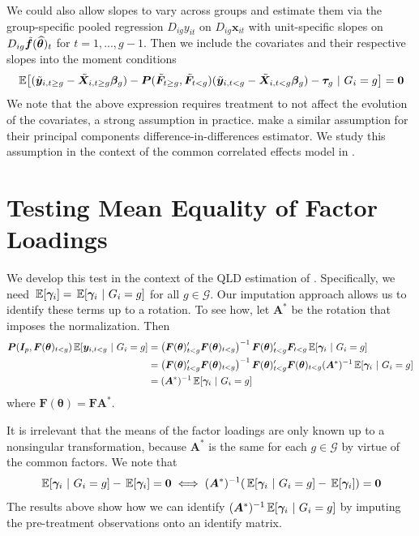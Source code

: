 \documentclass[12pt]{article}
\begin{document}
We could also allow slopes to vary across groups and estimate them via the group-specific pooled regression $D_{ig} y_{it}$ on $D_{ig} \bm x_{it}$ with unit-specific slopes on $D_{ig} \Tilde{\bm f}(\widehat{\bm \theta})_t$ for $t = 1,..., g-1$. Then we include the covariates and their respective slopes into the moment conditions
\begin{equation}
    \E{(\tilde{\bm y}_{i,t\geq g} - \tilde{\bm X}_{i, t \geq g} \bm \beta_g) - \bm P(\tilde{\bm F}_{t \geq g}, \tilde{\bm F}_{t < g}) (\tilde{\bm y}_{i,t< g} - \tilde{\bm X}_{i, t < g} \bm \beta_g) - \bm \tau_g  }{G_i = g} = \bm 0
\end{equation}
We note that the above expression requires treatment to not affect the evolution of the covariates, a strong assumption in practice. \citet{Chan_and_Kwok_2022} make a similar assumption for their principal components difference-in-differences estimator. We study this assumption in the context of the common correlated effects model in \citet{Brown_Butts_Westerlund_2023}.


\section{Testing Mean Equality of Factor Loadings}

We develop this test in the context of the QLD estimation of \citet{Ahn_Lee_Schmidt_2013}. Specifically, we need $\expec{\bm \gamma_i} = \E{\bm \gamma_i}{G_i = g}$ for all $g \in \mathcal{G}$. Our imputation approach allows us to identify these terms up to a rotation. To see how, let $\bm A^*$ be the rotation that imposes the \citet{Ahn_Lee_Schmidt_2013} normalization. Then
\begin{align*}
    \bm P(\bm I_{p}, \bm F(\bm \theta)_{t < g}) \E{\bm y_{i, t < g}}{G_i = g} 
    &= \left( \bm F(\bm \theta)_{t < g}' \bm F(\bm \theta)_{t < g} \right)^{-1} \bm F(\bm \theta)_{t < g}' \bm F_{t < g} \E{\bm \gamma_i}{G_i = g}\\
    &= \left( \bm F(\bm \theta)_{t < g}' \bm F(\bm \theta)_{t < g} \right)^{-1} \bm F(\bm \theta)_{t < g}' \bm F(\bm \theta)_{t < g} (\bm A^*)^{-1} \E{\bm \gamma_i}{G_i = g}\\
    &= (\bm A^*)^{-1} \E{\bm \gamma_i}{G_i = g}
\end{align*}
where $\bm F(\bm \theta) = \bm F \bm A^*$.

It is irrelevant that the means of the factor loadings are only known up to a nonsingular transformation, because $\bm A^*$ is the same for each $g \in \mathcal{G}$ by virtue of the common factors. We note that
\begin{equation}
    \E{\bm \gamma_i}{G_i = g} - \expec{\bm \gamma_i} = \bm 0 \iff (\bm A^*)^{-1}(\E{\bm \gamma_i}{G_i = g} - \expec{\bm \gamma_i}) = \bm 0
\end{equation}
The results above show how we can identify $(\bm A^*)^{-1} \E{\bm \gamma_i}{G_i = g}$ by imputing the pre-treatment observations onto an identify matrix. 
\end{document}
